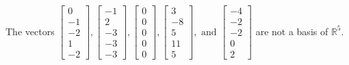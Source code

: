 \begin{exercise}
\begin{exerciseStatement}
  \end{exerciseStatement}
  \begin{exerciseAnswer}
   The vectors \(\left[\begin{array}{r}
0 \\
-1 \\
-2 \\
1 \\
-2
\end{array}\right] , \left[\begin{array}{r}
-1 \\
2 \\
-3 \\
-3 \\
-3
\end{array}\right] , \left[\begin{array}{r}
0 \\
0 \\
0 \\
0 \\
0
\end{array}\right] , \left[\begin{array}{r}
3 \\
-8 \\
5 \\
11 \\
5
\end{array}\right] , \text{ and } \left[\begin{array}{r}
-4 \\
-2 \\
-2 \\
0 \\
2
\end{array}\right]\) 
  	 are not  a basis of \(\mathbb{R}^5\).
  


  \end{exerciseAnswer}
\end{exercise}